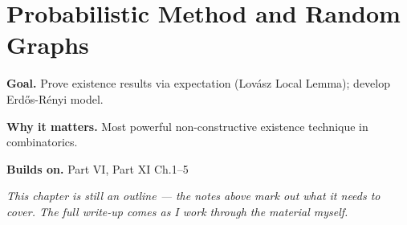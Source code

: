 \chapter{Probabilistic Method and Random Graphs}
\label{ch:11-probability-theory-10}

\begin{chapterintro}
\textbf{Goal.} Prove existence results via expectation (Lovász Local Lemma); develop Erdős-Rényi model.

\textbf{Why it matters.} Most powerful non-constructive existence technique in combinatorics.

\textbf{Builds on.} Part VI, Part XI Ch.1–5
\end{chapterintro}

\textit{This chapter is still an outline --- the notes above mark out what it needs to cover. The full write-up comes as I work through the material myself.}
